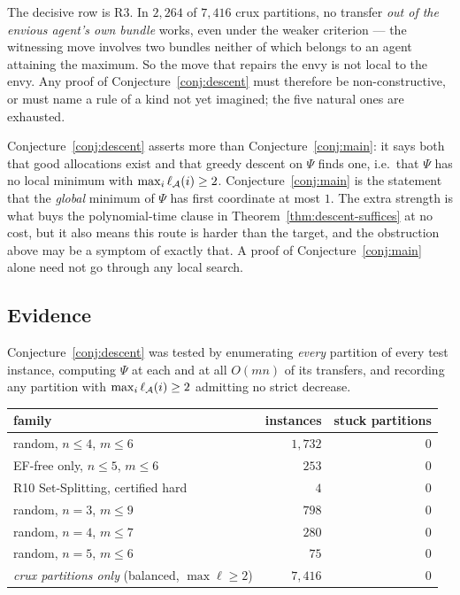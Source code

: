 The decisive row is R3. In $2{,}264$ of $7{,}416$ crux partitions, no transfer
\emph{out of the envious agent's own bundle} works, even under the weaker
criterion --- the witnessing move involves two bundles neither of which belongs
to an agent attaining the maximum. So the move that repairs the envy is not
local to the envy. Any proof of Conjecture~\ref{conj:descent} must therefore be
non-constructive, or must name a rule of a kind not yet imagined; the five
natural ones are exhausted.

\begin{remark}
\label{rem:descent-stronger}
Conjecture~\ref{conj:descent} asserts more than
Conjecture~\ref{conj:main}: it says both that good allocations exist and that
greedy descent on $\Psi$ finds one, i.e.\ that $\Psi$ has no local minimum with
$\max_i \ell_{\mathcal{A}}(i) \ge 2$. Conjecture~\ref{conj:main} is the statement
that the \emph{global} minimum of $\Psi$ has first coordinate at most $1$. The
extra strength is what buys the polynomial-time clause in
Theorem~\ref{thm:descent-suffices} at no cost, but it also means this route is
harder than the target, and the obstruction above may be a symptom of exactly
that. A proof of Conjecture~\ref{conj:main} alone need not go through any local
search.
\end{remark}

\subsection{Evidence}

Conjecture~\ref{conj:descent} was tested by enumerating \emph{every} partition of
every test instance, computing $\Psi$ at each and at all $O(mn)$ of its
transfers, and recording any partition with $\max_i \ell_{\mathcal{A}}(i) \ge 2$
admitting no strict decrease.

\begin{center}
\begin{tabular}{lrr}
\toprule
family & instances & stuck partitions \\
\midrule
random, $n \le 4$, $m \le 6$                    & $1{,}732$ & $0$ \\
EF-free only, $n \le 5$, $m \le 6$              & $253$     & $0$ \\
R10 Set-Splitting, certified hard               & $4$       & $0$ \\
random, $n = 3$, $m \le 9$                      & $798$     & $0$ \\
random, $n = 4$, $m \le 7$                      & $280$     & $0$ \\
random, $n = 5$, $m \le 6$                      & $75$      & $0$ \\
\midrule
\emph{crux partitions only} (balanced, $\max \ell \ge 2$) & $7{,}416$ & $0$ \\
\bottomrule
\end{tabular}
\end{center}

